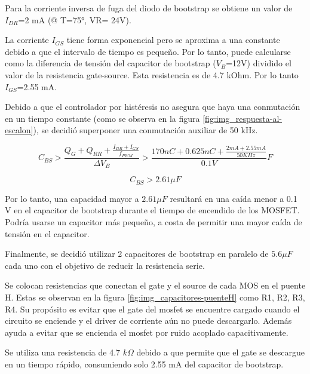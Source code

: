 \noindent Para la corriente inversa de fuga del diodo de bootstrap se obtiene un valor de $I_{DR}$=2 mA (@ T=75°, VR= 24V).

\noindent La corriente $I_{GS}$ tiene forma exponencial pero se aproxima a una constante debido a que el intervalo de tiempo es pequeño. Por lo tanto, puede calcularse como la diferencia de tensión del capacitor de bootstrap ($V_B$=12V) dividido el valor de la resistencia gate-source. Esta resistencia es de 4.7 kOhm. Por lo tanto $I_{GS}$=2.55 mA. 

\noindent Debido a que el controlador por histéresis no asegura que haya una conmutación en un tiempo constante (como se observa en la figura \ref{fig:img_respuesta-al-escalon}), se decidió superponer una conmutación auxiliar de 50 kHz. 

\begin{equation} \label{eq_cap-bootstrap2}
C_{BS} > \frac{Q_G+Q_{RR} + \frac{I_{DR}+I_{GS}}{f_{PWM}}}{\Delta V_B}>\frac{170 nC + 0.625nC + \frac{2 mA + 2.55 mA}{50 KHz}}{0.1 V} F
\end{equation}

\begin{equation} \label{eq_cap-bootstrap3}
	C_{BS} > 2.61 \mu F
\end{equation}



\noindent Por lo tanto, una capacidad mayor a $2.61 \mu F$ resultará en una caída menor a 0.1 V en el capacitor de bootstrap durante el tiempo de encendido de los MOSFET. Podría usarse un capacitor más pequeño, a costa de permitir una mayor caída de tensión en el capacitor. 

\noindent Finalmente, se decidió utilizar 2 capacitores de bootstrap en paralelo de $5.6 \mu F$ cada uno con el objetivo de reducir la resistencia serie.



\noindent Se colocan resistencias que conectan el gate y el source de cada MOS en el puente H. Estas se observan en la figura \ref{fig:img_capacitores-puenteH} como R1, R2, R3, R4. Su propósito es evitar que el gate del mosfet se encuentre cargado cuando el circuito se enciende y el driver de corriente aún no puede descargarlo. Además ayuda a evitar que se encienda el mosfet por ruido acoplado capacitivamente. 

\noindent Se utiliza una resistencia de 4.7 $k\Omega$ debido a que permite que el gate se descargue en un tiempo rápido, consumiendo solo 2.55 mA del capacitor de bootstrap.

